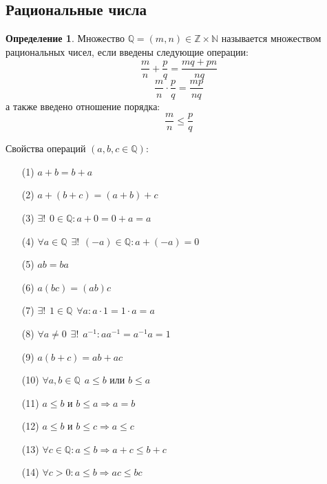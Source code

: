 \documentclass[a4paper, 12pt]{article}
\newcommand{\Z}{\mathbb{Z}}
\newcommand{\N}{\mathbb{N}}
\newcommand{\Q}{\mathbb{Q}}
\theoremstyle{definition}
\newtheorem*{definition}{Определение}
\begin{document}
    \subsection{Рациональные числа}
        \begin{definition}
            Множество $\Q=(m,n)\in \Z \times \N$ называется множеством рациональных чисел, если введены следующие операции:
            $$\frac{m}{n}+\frac{p}{q}=\frac{mq+pn}{nq}$$
            $$\frac{m}{n}\cdot \frac{p}{q}=\frac{mp}{nq}$$
            а также введено отношение порядка:
            $$\frac{m}{n}\leq \frac{p}{q}$$
        \end{definition}
        Свойства операций $(a,b,c \in \Q)$:\\
        \begin{itemize}
            \item[(1)] $a+b=b+a$
            \item[(2)] $a+(b+c)=(a+b)+c$
            \item[(3)] $\exists ! \hspace{5pt} 0 \in \Q: a+0=0+a=a$
            \item[(4)] $\forall a\in \Q \hspace{5pt} \exists ! \hspace{5pt} (-a)\in \Q: a+(-a)=0$
            \item[(5)] $ab=ba$
            \item[(6)] $a(bc)=(ab)c$
            \item[(7)] $\exists ! \hspace{5pt} 1\in \Q \hspace{5pt} \forall a: a\cdot 1=1\cdot a=a$
            \item[(8)] $\forall a\ne 0 \hspace{5pt} \exists ! \hspace{5pt} a^{-1}: aa^{-1}=a^{-1}a=1$
            \item[(9)] $a(b+c)=ab+ac$
            \item[(10)] $\forall a,b\in \Q \hspace{5pt} a\leq b$ или $b\leq a$
            \item[(11)] $a\leq b$ и $b\leq a \Rightarrow a=b$
            \item[(12)] $a\leq b$ и $b\leq c \Rightarrow a\leq c$
            \item[(13)] $\forall c \in \Q: a\leq b \Rightarrow a+c\leq b+c$
            \item[(14)] $\forall c>0: a\leq b\Rightarrow ac\leq bc$
        \end{itemize}
\end{document}
